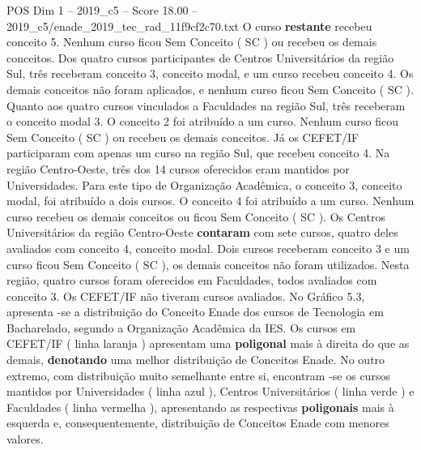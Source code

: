 \begin{textsample}{POS Dim 1 – 2019\_c5 – Score 18.00 – 2019\_c5/enade\_2019\_tec\_rad\_11f9cf2c70.txt}
O curso \textbf{restante} recebeu conceito 5.
Nenhum curso ficou Sem Conceito ( SC ) ou recebeu os demais conceitos.
Dos quatro cursos participantes de Centros Universitários da região Sul, três receberam conceito 3, conceito modal, e um curso recebeu conceito 4.
Os demais conceitos não foram aplicados, e nenhum curso ficou Sem Conceito ( SC ).
Quanto aos quatro cursos vinculados a Faculdades na região Sul, três receberam o conceito modal 3.
O conceito 2 foi atribuído a um curso.
Nenhum curso ficou Sem Conceito ( SC ) ou recebeu os demais conceitos.
Já os CEFET/IF participaram com apenas um curso na região Sul, que recebeu conceito 4.
Na região Centro-Oeste, três dos 14 cursos oferecidos eram mantidos por Universidades.
Para este tipo de Organização Acadêmica, o conceito 3, conceito modal, foi atribuído a dois cursos.
O conceito 4 foi atribuído a um curso.
Nenhum curso recebeu os demais conceitos ou ficou Sem Conceito ( SC ).
Os Centros Universitários da região Centro-Oeste \textbf{contaram} com sete cursos, quatro deles avaliados com conceito 4, conceito modal.
Dois cursos receberam conceito 3 e um curso ficou Sem Conceito ( SC ), os demais conceitos não foram utilizados.
Nesta região, quatro cursos foram oferecidos em Faculdades, todos avaliados com conceito 3.
Os CEFET/IF não tiveram cursos avaliados.
No Gráfico 5.3, apresenta -se a distribuição do Conceito Enade dos cursos de Tecnologia em Bacharelado, segundo a Organização Acadêmica da IES.
Os cursos em CEFET/IF ( linha laranja ) apresentam uma \textbf{poligonal} mais à direita do que as demais, \textbf{denotando} uma melhor distribuição de Conceitos Enade.
No outro extremo, com distribuição muito semelhante entre si, encontram -se os cursos mantidos por Universidades ( linha azul ), Centros Universitários ( linha verde ) e Faculdades ( linha vermelha ), apresentando as respectivas \textbf{poligonais} mais à esquerda e, consequentemente, distribuição de Conceitos Enade com menores valores.

\end{textsample}
